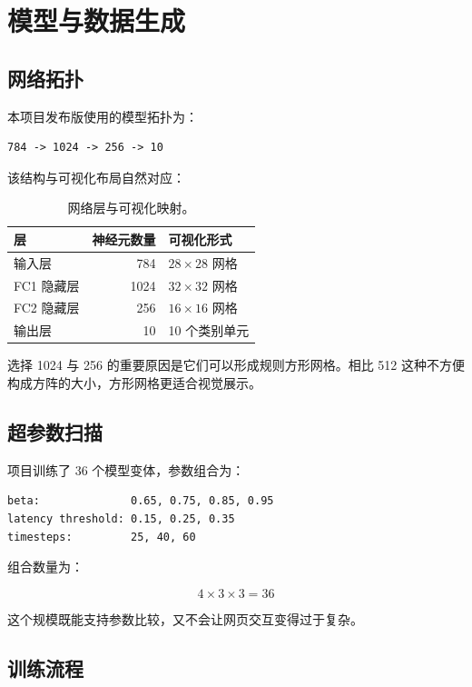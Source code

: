 \documentclass[UTF8,11pt,a4paper]{ctexart}
\begin{document}
\section{模型与数据生成}

\subsection{网络拓扑}

本项目发布版使用的模型拓扑为：

\begin{lstlisting}
784 -> 1024 -> 256 -> 10
\end{lstlisting}

该结构与可视化布局自然对应：

\begin{table}[H]
\centering
\caption{网络层与可视化映射。}
\begin{tabularx}{0.86\textwidth}{lrl}
\toprule
层 & 神经元数量 & 可视化形式 \\
\midrule
输入层 & 784 & $28\times28$ 网格 \\
FC1 隐藏层 & 1024 & $32\times32$ 网格 \\
FC2 隐藏层 & 256 & $16\times16$ 网格 \\
输出层 & 10 & 10 个类别单元 \\
\bottomrule
\end{tabularx}
\end{table}

选择 1024 与 256 的重要原因是它们可以形成规则方形网格。相比 512 这种不方便构成方阵的大小，方形网格更适合视觉展示。

\subsection{超参数扫描}

项目训练了 36 个模型变体，参数组合为：

\begin{lstlisting}
beta:              0.65, 0.75, 0.85, 0.95
latency threshold: 0.15, 0.25, 0.35
timesteps:         25, 40, 60
\end{lstlisting}

组合数量为：

\begin{equation}
4 \times 3 \times 3 = 36
\end{equation}

这个规模既能支持参数比较，又不会让网页交互变得过于复杂。

\subsection{训练流程}
\end{document}
